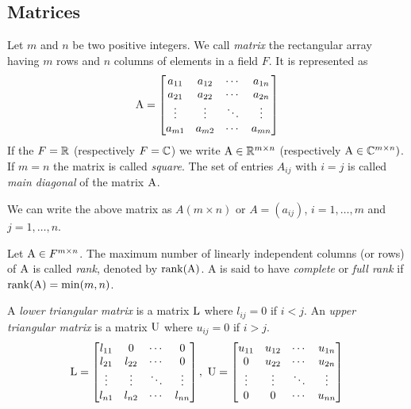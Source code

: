 \subsection{Matrices}

\begin{definition}
    Let $m$ and $n$ be two positive integers. We call \textit{matrix} the rectangular array having $m$ rows and $n$ columns of elements in a field $F$. It is represented as
    $$
        \mathrm{A} = \left[\begin{matrix}
        a_{11} & a_{12} & \cdots & a_{1n} \\
        a_{21} & a_{22} & \cdots & a_{2n} \\
        \vdots & \vdots & \ddots & \vdots \\
        a_{m1} & a_{m2} & \cdots & a_{mn}
        \end{matrix}\right]
    $$
    If the $F = \mathbb{R}$ (respectively $F = \mathbb{C}$) we write $\mathrm{A} \in \mathbb{R}^{m \times n}$ (respectively $\mathrm{A} \in \mathbb{C}^{m \times n})$. If $m = n$ the matrix is called \textit{square}. The set of entries $A_{ij}$ with $i = j$ is called \textit{main diagonal} of the matrix $\mathrm{A}$.
\end{definition}

We can write the above matrix as $A(m \times n)$ or $A = (a_{ij})$, $i = 1, \hdots, m$ and $j = 1, \hdots, n$.

\begin{definition}
    Let $\mathrm{A} \in F^{m \times n}$. The maximum number of linearly independent columns (or rows) of $\mathrm{A}$ is called \textit{rank}, denoted by $\mathrm{rank}(\mathrm{A})$. A is said to have \textit{complete} or \textit{full rank} if $\mathrm{rank}(\mathrm{A}) = \min(m, n)$.
\end{definition}

\begin{definition}
    A \textit{lower triangular matrix} is a matrix $\mathrm{L}$ where $l_{ij} = 0$ if $i < j$. An \textit{upper triangular matrix} is a matrix $\mathrm{U}$ where $u_{ij} = 0$ if $i > j$.
    $$
        \mathrm{L} = \left[\begin{matrix}
        l_{11} & 0 & \cdots & 0 \\
        l_{21} & l_{22} & \cdots & 0 \\
        \vdots & \vdots & \ddots & \vdots \\
        l_{n1} & l_{n2} & \cdots & l_{nn}
        \end{matrix}\right],\  
        \mathrm{U} = \left[\begin{matrix}
        u_{11} & u_{12} & \cdots & u_{1n} \\
        0 & u_{22} & \cdots & u_{2n} \\
        \vdots & \vdots & \ddots & \vdots \\
        0 & 0 & \cdots & u_{nn}
        \end{matrix}\right]
    $$
\end{definition}

